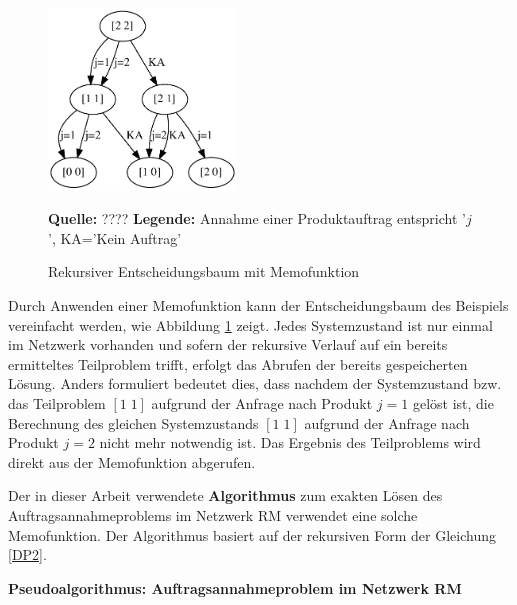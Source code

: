 \begin{figure}[h!]
  \begin{center}
    \includegraphics[width=50mm]{Bilder/Einfach2.pdf}
    \caption{Rekursiver Entscheidungsbaum mit Memofunktion}  \label{Einfach2}
        {\footnotesize \textbf{Quelle:} ????} 
    {\footnotesize \textbf{Legende:} Annahme einer Produktauftrag entspricht '$j$', KA='Kein Auftrag'} 
  \end{center}
\end{figure}

Durch Anwenden einer Memofunktion kann der Entscheidungsbaum des Beispiels vereinfacht werden, wie Abbildung \ref{Einfach2} zeigt. Jedes Systemzustand ist nur einmal im Netzwerk vorhanden und sofern der rekursive Verlauf auf ein bereits ermitteltes Teilproblem trifft, erfolgt das Abrufen der bereits gespeicherten Lösung. Anders formuliert bedeutet dies, dass nachdem der Systemzustand bzw. das Teilproblem $[1\; 1]$ aufgrund der Anfrage nach Produkt $j=1$ gelöst ist, die Berechnung des gleichen Systemzustands $[1\; 1]$ aufgrund der Anfrage nach Produkt $j=2$ nicht mehr notwendig ist. Das Ergebnis des Teilproblems wird direkt aus der Memofunktion abgerufen.

Der in dieser Arbeit verwendete \textbf{Algorithmus} zum exakten Lösen des Auftragsannahmeproblems im Netzwerk RM verwendet eine solche Memofunktion. Der Algorithmus basiert auf der rekursiven Form der Gleichung \eqref{DP2}. 

\begin{algorithm}[H]
\textbf{Pseudoalgorithmus: Auftragsannahmeproblem im Netzwerk RM}\\
\end{algorithm}

